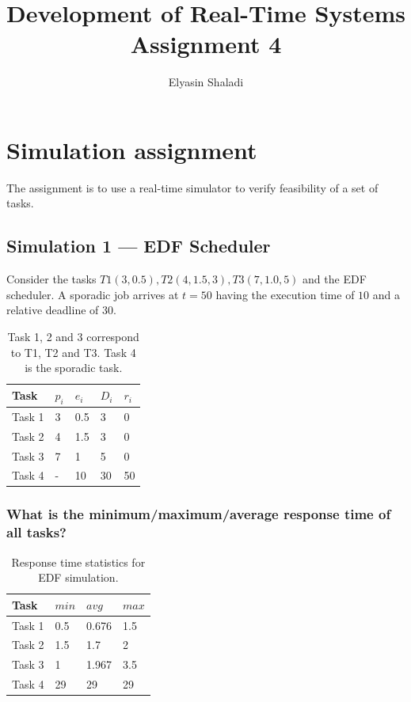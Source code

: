 \documentclass[a4paper]{article}
\begin{document}
\title{
Development of Real-Time Systems\\
Assignment 4
}
\author{Elyasin Shaladi}
\maketitle

\tableofcontents
\newpage
\listoftables
\lstlistoflistings
\listoffigures

\newpage

\section{Simulation assignment}
The assignment is to use a real-time simulator to verify feasibility of a set of tasks.

\subsection{Simulation 1 --- EDF Scheduler}

Consider the tasks $T1(3, 0.5), T2(4, 1.5, 3), T3(7, 1.0, 5)$ and the EDF scheduler. A sporadic job arrives at $t=50$ having the execution time of $10$ and a relative deadline of $30$.

\begin{table}[!htbp]
\begin{center}
\begin{tabular}{|l||l|l|l|l|}
\hline
Task   & $p_i$ & $e_i$ & $D_i$ & $r_i$\\
\hline
\hline
Task 1 & 3 & 0.5 & 3 & 0\\
\hline
Task 2 & 4 & 1.5 & 3 & 0\\
\hline
Task 3 & 7 & 1 & 5 & 0\\
\hline
Task 4 & - & 10 & 30 & 50 \\
\hline
\end{tabular}
\caption{Task 1, 2 and 3 correspond to T1, T2 and T3. Task 4 is the sporadic task.}
\end{center}
\end{table}

\subsubsection{What is the minimum/maximum/average response time of all tasks?}

\begin{table}[!htbp]
\begin{center}
\begin{tabular}{|l||l|l|l|}
\hline
Task   & $min$ & $avg$ & $max$ \\
\hline
\hline
Task 1 & 0.5 & 0.676 & 1.5 \\
\hline
Task 2 & 1.5 & 1.7 & 2 \\
\hline
Task 3 & 1 & 1.967 & 3.5 \\
\hline
Task 4 & 29 & 29 & 29 \\
\hline
\end{tabular}
\caption{Response time statistics for EDF simulation.}
\end{center}
\end{table}
\end{document}
